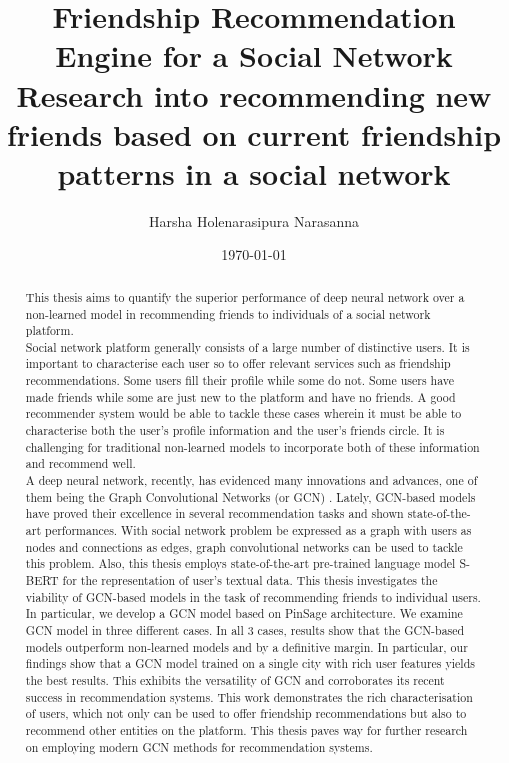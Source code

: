 \documentclass{kththesis}
\title{Friendship Recommendation Engine for a Social Network \\
\vspace{20px}
\large Research into recommending new friends based on current friendship patterns in a social network}
\author{Harsha Holenarasipura Narasanna}
\date{\today}
\begin{document}
\frontmatter

\titlepage

\begin{abstract}
This thesis aims to quantify the superior performance of deep neural network over a non-learned model in recommending friends to individuals of a social network platform. \\

Social network platform generally consists of a large number of distinctive users. It is important to characterise each user so to offer relevant services such as friendship recommendations. Some users fill their profile while some do not. Some users have made friends while some are just new to the platform and have no friends. A good recommender system would be able to tackle these cases wherein it must be able to characterise both the user's profile information and the user's friends circle. It is challenging for traditional non-learned models to incorporate both of these information and recommend well. \\

A deep neural network, recently, has evidenced many innovations and advances, one of them being the Graph Convolutional Networks (or GCN) \cite{PinSage}. Lately, GCN-based models have proved their excellence in several recommendation tasks and shown state-of-the-art performances. With social network problem be expressed as a graph with users as nodes and connections as edges, graph convolutional networks can be used to tackle this problem. Also, this thesis employs state-of-the-art pre-trained language model S-BERT for the representation of user's textual data. This thesis investigates the viability of GCN-based models in the task of recommending friends to individual users. \\

In particular, we develop a GCN model based on PinSage architecture. We examine GCN model in three different cases. In all 3 cases, results show that the GCN-based models outperform non-learned models and by a definitive margin. In particular, our findings show that a GCN model trained on a single city with rich user features yields the best results. This exhibits the versatility of GCN and corroborates its recent success in recommendation systems. This work demonstrates the rich characterisation of users, which not only can be used to offer friendship recommendations but also to recommend other entities on the platform. This thesis paves way for further research on employing modern GCN methods for recommendation systems. \\

\end{abstract}
\end{document}
